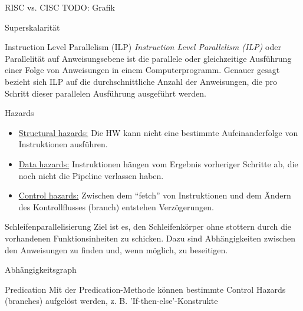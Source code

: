 \begin{example}[Pipelining]{RISC vs. CISC}
    TODO: Grafik
\end{example}

\begin{defi}{Superskalarität}
    
\end{defi}

\begin{defi}{Instruction Level Parallelism (ILP)}\label{defi:ilp}
    \emph{Instruction Level Parallelism (ILP)} oder Parallelität auf Anweisungsebene ist die parallele oder gleichzeitige Ausführung einer Folge von Anweisungen in einem Computerprogramm. 
    Genauer gesagt bezieht sich ILP auf die durchschnittliche Anzahl der Anweisungen, die pro Schritt dieser parallelen Ausführung ausgeführt werden.
\end{defi}

\begin{defi}{Hazards}
    \begin{itemize}
        \item \underline{Structural hazards:}
              Die HW kann nicht eine bestimmte Aufeinanderfolge von Instruktionen ausführen.
        \item \underline{Data hazards:}
              Instruktionen hängen vom Ergebnis vorheriger Schritte ab, 
              die noch nicht die Pipeline verlassen haben.
        \item \underline{Control hazards:}
              Zwischen dem \enquote{fetch} von Instruktionen und dem Ändern des Kontrollflusses (branch) entstehen Verzögerungen.
    \end{itemize}
\end{defi}

\begin{defi}{Schleifenparallelisierung}
    Ziel ist es, 
    den Schleifenkörper ohne stottern durch die vorhandenen Funktionsinheiten zu schicken.
    Dazu sind Abhängigkeiten zwischen den Anweisungen zu finden und, 
    wenn möglich, zu beseitigen.
\end{defi}

\begin{defi}{Abhängigkeitsgraph}
    
\end{defi}

\begin{defi}{Predication}
    Mit der Predication-Methode können bestimmte Control Hazards (branches) aufgelöst werden, 
    z. B. 'If-then-else'-Konstrukte
\end{defi}

